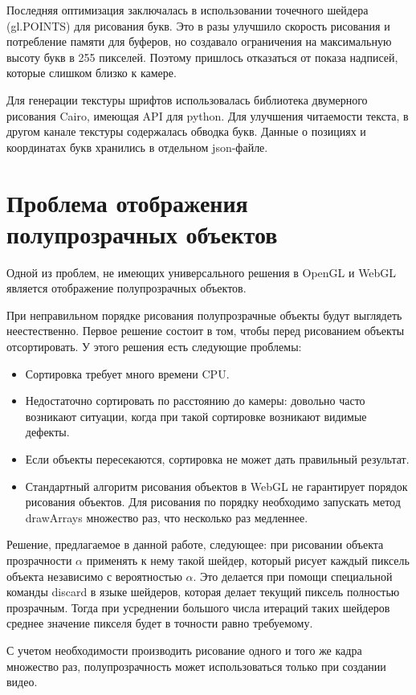 Последняя оптимизация заключалась в использовании точечного шейдера (gl.POINTS) для рисования букв. Это в разы улучшило скорость рисования и потребление памяти для буферов, но создавало ограничения на максимальную высоту букв в 255 пикселей. Поэтому пришлось отказаться от показа надписей, которые слишком близко к камере.

Для генерации текстуры шрифтов использовалась библиотека двумерного рисования Cairo, имеющая API для python. Для улучшения читаемости текста, в другом канале текстуры содержалась обводка букв. Данные о позициях и координатах букв хранились в отдельном json-файле.

\section{Проблема отображения полупрозрачных объектов}

Одной из проблем, не имеющих универсального решения в OpenGL и WebGL является отображение полупрозрачных объектов.

При неправильном порядке рисования полупрозрачные объекты будут выглядеть неестественно. Первое решение состоит в том, чтобы перед рисованием объекты отсортировать. У этого решения есть следующие проблемы:

\begin{itemize}
\item Сортировка требует много времени CPU.
\item Недостаточно сортировать по расстоянию до камеры: довольно часто возникают ситуации, когда при такой сортировке возникают видимые дефекты.
\item Если объекты пересекаются, сортировка не может дать правильный результат.
\item Стандартный алгоритм рисования объектов в WebGL не гарантирует порядок рисования объектов. Для рисования по порядку необходимо запускать метод drawArrays множество раз, что несколько раз медленнее.
\end{itemize}

Решение, предлагаемое в данной работе, следующее: при рисовании объекта прозрачности $\alpha$ применять к нему такой шейдер, который рисует каждый пиксель объекта независимо с вероятностью $\alpha$. Это делается при помощи специальной команды discard в языке шейдеров, которая делает текущий пиксель полностью прозрачным. Тогда при усреднении большого числа итераций таких шейдеров среднее значение пикселя будет в точности равно требуемому.

С учетом необходимости производить рисование одного и того же кадра множество раз, полупрозрачность может использоваться только при создании видео.

